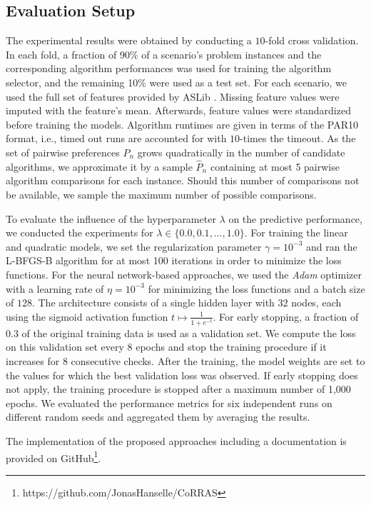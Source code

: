 \documentclass[runningheads]{llncs}
\begin{document}
\subsection{Evaluation Setup}
The experimental results were obtained by conducting a $10$-fold cross validation. In each fold, a fraction of 90\% of a scenario's problem instances and the corresponding algorithm performances was used for training the algorithm selector, and the remaining 10\% were used as a test set. For each scenario, we used the full set of features provided by ASLib \cite{bischl_aslib:_2016}. Missing feature values were imputed with the feature's mean. Afterwards, feature values were standardized before training the models. Algorithm runtimes are given in terms of the PAR10 format, i.e., timed out runs are accounted for with $10$-times the timeout. 
As the set of pairwise preferences $P_n$ grows quadratically in the number of candidate algorithms, we approximate it by a sample $\hat{P}_n$ containing at most 5 pairwise algorithm comparisons for each instance. Should this number of comparisons not be available, we sample the maximum number of possible comparisons. 

 To evaluate the influence of the hyperparameter $\lambda$ on the predictive performance, we conducted the experiments for $\lambda \in \{0.0,0.1,\dots,1.0\}$.
 For training the linear and quadratic models, we set the regularization parameter $\gamma = 10^{-3}$ and ran the L-BFGS-B \cite{byrd_limited_1995,zhu_algorithm_1997} algorithm for at most 100 iterations in order to minimize the loss functions.
For the neural network-based approaches, we used the \textit{Adam} \cite{kingma_adam_2015} optimizer with a learning rate of $\eta = 10^{-3}$ for minimizing the loss functions and a batch size of $128$. The architecture consists of a single hidden layer with $32$ nodes, each using the sigmoid activation function $t \mapsto \frac{1}{1 + e^{-t}}$.
For early stopping, a fraction of $0.3$ of the original training data is used as a validation set. We compute the loss on this validation set every $8$ epochs and stop the training procedure if it increases for $8$ consecutive checks. After the training, the model weights are set to the values for which the best validation loss was observed. If early stopping does not apply, the training procedure is stopped after a maximum number of 1,000 epochs. We evaluated the performance metrics for six independent runs on different random seeds and aggregated them by averaging the results.

The implementation of the proposed approaches including a documentation is provided on GitHub\footnote{https://github.com/JonasHanselle/CoRRAS}.
\end{document}
